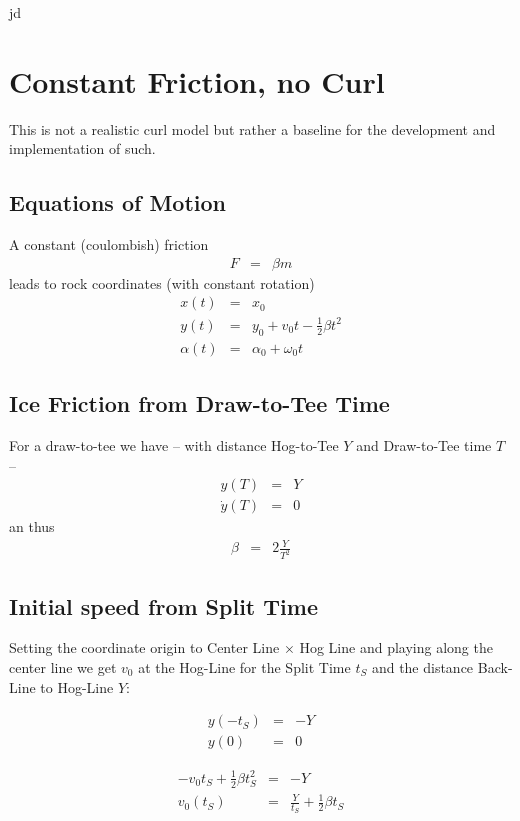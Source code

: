 jd\section{Constant Friction, no Curl}
This is not a realistic curl model but rather a baseline for the development 
and implementation of such.

\subsection{Equations of Motion}
A constant (coulombish) friction
\begin{eqnarray}
F &=& \beta m
\end{eqnarray}
leads to rock coordinates (with constant rotation)
\begin{eqnarray}
x(t) &=& x_0 \\
y(t) &=& y_0 + v_0t - \frac{1}{2}\beta t^2 \\
\alpha(t) &=& \alpha_0 + \omega_0 t
\end{eqnarray}

\subsection{Ice Friction from Draw-to-Tee Time}
For a draw-to-tee we have -- with distance Hog-to-Tee $Y$ and Draw-to-Tee time 
$T$ --
\begin{eqnarray}
y(T) &=& Y \\
\dot y(T) &=& 0
\end{eqnarray}
an thus
\begin{eqnarray}
\beta &=& 2 \frac {Y}{T^2}
\end{eqnarray}

\subsection{Initial speed from Split Time}
Setting the coordinate origin to Center Line $\times$ Hog Line and playing 
along the center line we get $v_0$ at the Hog-Line for the Split Time $t_S$ and 
the distance Back-Line to Hog-Line $Y$:

\begin{eqnarray}
y(-t_S) &=& -Y \\
y(0) &=& 0
\end{eqnarray}

\begin{eqnarray}
-v_0 t_S + \frac{1}{2}\beta t_S^2 &=& -Y \\
v_0(t_S) &=& \frac{Y}{t_S} + \frac{1}{2}\beta t_S
\end{eqnarray}
